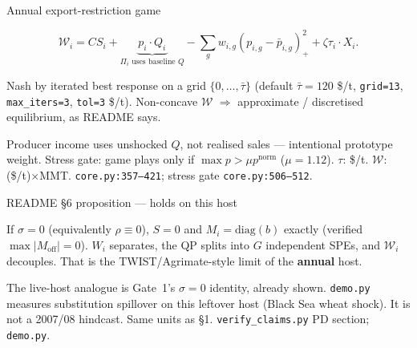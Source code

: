 \begin{frame}{Annual export-restriction game}

\[
\mathcal{W}_i
= CS_i + \underbrace{p_i\cdot Q_i}_{\Pi_i\text{ uses baseline }Q}
- \sum_g w_{i,g}(p_{i,g}-\bar p_{i,g})_+^2
+ \zeta \tau_i\cdot X_i.
\]

Nash by iterated best response on a grid $\{0,\ldots,\bar\tau\}$
(default $\bar\tau=120$ \$/t, \texttt{grid=13}, \texttt{max\_iters=3},
\texttt{tol=3} \$/t). Non-concave $\mathcal{W}$ $\Rightarrow$ approximate /
discretised equilibrium, as README says.

Producer income uses unshocked $Q$, not realised sales --- intentional
prototype weight. Stress gate: game plays only if
$\max p > \mu p^{\mathrm{norm}}$ ($\mu=1.12$).
{$\tau$: \$/t. $\mathcal{W}$: (\$/t)$\times$MMT.}
{\texttt{core.py:357--421}; stress gate \texttt{core.py:506--512}.}
\end{frame}

\begin{frame}{README \S6 proposition --- holds on this host}

If $\sigma=0$ (equivalently $\rho\equiv 0$), $S=0$ and $M_i=\mathrm{diag}(b)$
exactly (verified $\max|M_{\mathrm{off}}|=0$). $W_i$ separates, the QP
splits into $G$ independent SPEs, and $\mathcal{W}_i$ decouples. That is
the TWIST/Agrimate-style limit of the \textbf{annual} host.

The live-host analogue is Gate~1's $\sigma=0$ identity, already shown.
\texttt{demo.py} measures substitution spillover on this leftover host
(Black Sea wheat shock). It is not a 2007/08 hindcast.
{Same units as \S1.}
{\texttt{verify\_claims.py} PD section; \texttt{demo.py}.}
\end{frame}
